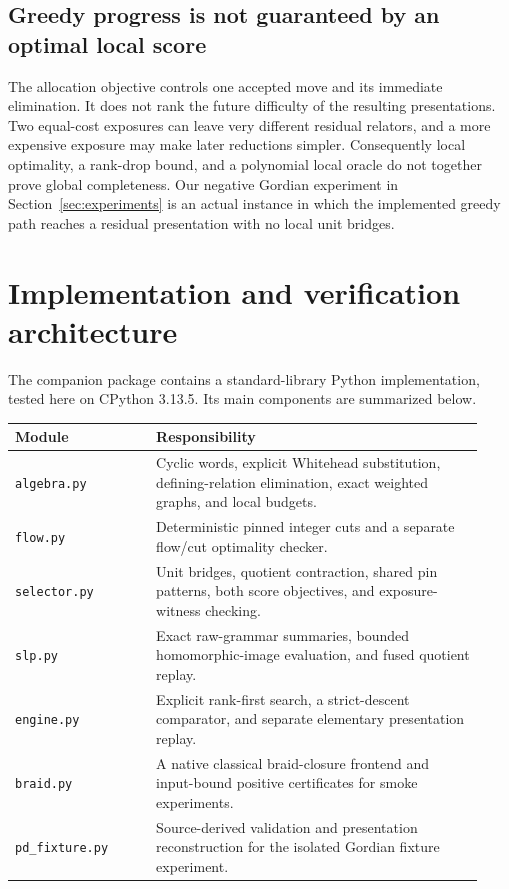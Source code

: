 \documentclass[11pt,letterpaper]{article}
\theoremstyle{definition}\newtheorem{definition}[theorem]{Definition}
\begin{document}
\subsection{Greedy progress is not guaranteed by an optimal local score}
The allocation objective controls one accepted move and its immediate elimination. It does not rank the future difficulty of the resulting presentations. Two equal-cost exposures can leave very different residual relators, and a more expensive exposure may make later reductions simpler. Consequently local optimality, a rank-drop bound, and a polynomial local oracle do not together prove global completeness. Our negative Gordian experiment in Section~\ref{sec:experiments} is an actual instance in which the implemented greedy path reaches a residual presentation with no local unit bridges.

\section{Implementation and verification architecture}\label{sec:implementation}
The companion package contains a standard-library Python implementation, tested here on CPython 3.13.5. Its main components are summarized below.
\begin{center}
\begin{tabular}{p{0.28\linewidth}p{0.65\linewidth}}
\toprule Module & Responsibility\\\midrule
\texttt{algebra.py} & Cyclic words, explicit Whitehead substitution, defining-relation elimination, exact weighted graphs, and local budgets.\\
\texttt{flow.py} & Deterministic pinned integer cuts and a separate flow/cut optimality checker.\\
\texttt{selector.py} & Unit bridges, quotient contraction, shared pin patterns, both score objectives, and exposure-witness checking.\\
\texttt{slp.py} & Exact raw-grammar summaries, bounded homomorphic-image evaluation, and fused quotient replay.\\
\texttt{engine.py} & Explicit rank-first search, a strict-descent comparator, and separate elementary presentation replay.\\
\texttt{braid.py} & A native classical braid-closure frontend and input-bound positive certificates for smoke experiments.\\
\texttt{pd\_fixture.py} & Source-derived validation and presentation reconstruction for the isolated Gordian fixture experiment.\\\bottomrule
\end{tabular}
\end{center}
\end{document}
